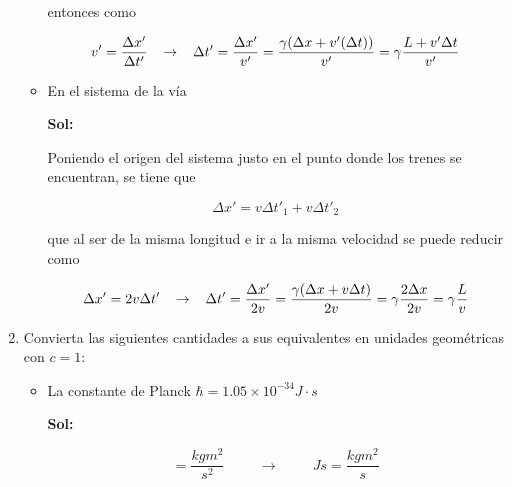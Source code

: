 \documentclass[12pt,a4paper]{article}
\begin{document}
\begin{enumerate}
\begin{itemize}
    entonces como
    
    \begin{equation*}
        v' = \frac{\Delta x'}{\Delta t'} \hspace{0.3cm} \rightarrow \hspace{0.3cm} \Delta t' = \frac{\Delta x'}{v'}= \frac{\gamma (\Delta x + v' (\Delta t))}{v'} = \gamma \frac{L + v' \Delta t}{v'}
     \end{equation*}
    
    \item En el sistema de la vía
    
    \textbf{Sol:}
    
    Poniendo el origen del sistema  justo en el punto donde los trenes se encuentran, se tiene que
    
    \begin{equation*}
        \Delta x' = v\Delta t'_1 + v \Delta t'_2 
    \end{equation*}
    
    que al ser de la misma longitud e ir a la misma velocidad se puede reducir como
    
    \begin{equation*}
        \Delta x' = 2v\Delta t'\hspace{0.3cm} \rightarrow \hspace{0.3cm} \Delta t' = \frac{\Delta x'}{2v} = \frac{\gamma(\Delta x + v \Delta t)}{2v} = \gamma \frac{2 \Delta x}{2v} = \gamma \frac{L}{v}
    \end{equation*}
    
\end{itemize}






\item Convierta las siguientes cantidades a sus equivalentes en unidades geométricas con $c=1$:

\begin{itemize}
    \item La constante de Planck $\hbar = 1.05 \times 10^{-34} J \cdot s$
    
    \textbf{Sol:}
    
    \begin{equation*}
        [J] = \frac{kg m^2}{s^2} \hspace{1cm} \rightarrow \hspace{1cm} Js = \frac{kg m^2}{s}
    \end{equation*}
    

\end{itemize}
\end{enumerate}
\end{document}
